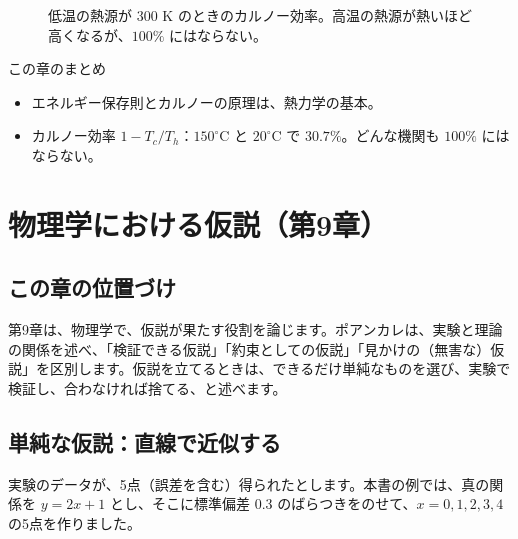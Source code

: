 \documentclass[a4paper,11pt,openany]{ltjsbook}
\begin{document}
\begin{figure}[htbp]
\centering
{}
\caption{低温の熱源が $300$ K のときのカルノー効率。高温の熱源が熱いほど高くなるが、$100\%$ にはならない。}
\end{figure}

\begin{pointbox}{この章のまとめ}
\begin{itemize}[leftmargin=*]
\item エネルギー保存則とカルノーの原理は、熱力学の基本。
\item カルノー効率 $1-T_c/T_h$：$150^\circ$C と $20^\circ$C で $30.7\%$。どんな機関も $100\%$ にはならない。
\end{itemize}
\end{pointbox}

\chapter{物理学における仮説（第9章）}

\section{この章の位置づけ}

第9章は、物理学で、仮説が果たす役割を論じます。ポアンカレは、実験と理論の関係を述べ、「検証できる仮説」「約束としての仮説」「見かけの（無害な）仮説」を区別します。仮説を立てるときは、できるだけ単純なものを選び、実験で検証し、合わなければ捨てる、と述べます。

\section{単純な仮説：直線で近似する}

実験のデータが、5点（誤差を含む）得られたとします。本書の例では、真の関係を $y=2x+1$ とし、そこに標準偏差 $0.3$ のばらつきをのせて、$x=0,1,2,3,4$ の5点を作りました。
\end{document}
